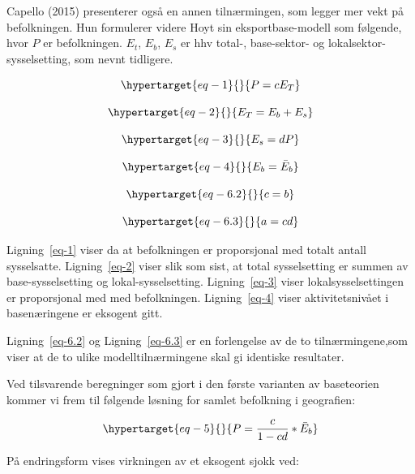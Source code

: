 \documentclass[
]{article}
\begin{document}
Capello (2015) presenterer også en annen tilnærmingen, som legger mer
vekt på befolkningen. Hun formulerer videre Hoyt sin eksportbase-modell
som følgende, hvor \(P\) er befolkningen. \(E_t\), \(E_b\), \(E_s\) er
hhv total-, base-sektor- og lokalsektor-sysselsetting, som nevnt
tidligere.

\begin{equation}\protect\hypertarget{eq-1}{}{
P = cE_T
}\label{eq-1}\end{equation}

\begin{equation}\protect\hypertarget{eq-2}{}{
E_T = E_b + E_s
}\label{eq-2}\end{equation}

\begin{equation}\protect\hypertarget{eq-3}{}{
E_s = dP
}\label{eq-3}\end{equation}

\begin{equation}\protect\hypertarget{eq-4}{}{
E_b = \bar{E}_b
}\label{eq-4}\end{equation}

\begin{equation}\protect\hypertarget{eq-6.2}{}{
c = b 
}\label{eq-6.2}\end{equation}

\begin{equation}\protect\hypertarget{eq-6.3}{}{
a = cd
}\label{eq-6.3}\end{equation}

Ligning~\ref{eq-1} viser da at befolkningen er proporsjonal med totalt
antall sysselsatte. Ligning~\ref{eq-2} viser slik som sist, at total
sysselsetting er summen av base-sysselsetting og lokal-sysselsetting.
Ligning~\ref{eq-3} viser lokalsysselsettingen er proporsjonal med med
befolkningen. Ligning~\ref{eq-4} viser aktivitetsnivået i basenæringene
er eksogent gitt.

Ligning~\ref{eq-6.2} og Ligning~\ref{eq-6.3} er en forlengelse av de to
tilnærmingene,som viser at de to ulike modelltilnærmingene skal gi
identiske resultater.

Ved tilsvarende beregninger som gjort i den første varianten av
baseteorien kommer vi frem til følgende løsning for samlet befolkning i
geografien:

\begin{equation}\protect\hypertarget{eq-5}{}{
P=\frac{c}{1-cd}*\bar{E}_b
}\label{eq-5}\end{equation}

På endringsform vises virkningen av et eksogent sjokk ved:
\end{document}
